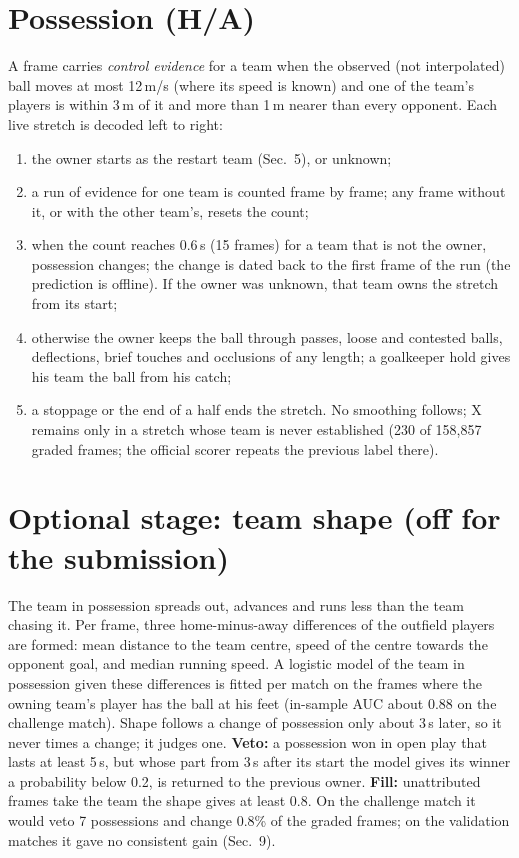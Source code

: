 \documentclass[10pt,a4paper]{article}
\begin{document}
\section{Possession (H/A)}
A frame carries \emph{control evidence} for a team when the observed (not interpolated) ball moves at most 12\,m/s (where its speed
is known) and one of the team's players is within 3\,m of it and more than 1\,m nearer than every opponent. Each live stretch is
decoded left to right:
\begin{enumerate}
\item the owner starts as the restart team (Sec.~5), or unknown;
\item a run of evidence for one team is counted frame by frame; any frame without it, or with the other team's, resets the count;
\item when the count reaches 0.6\,s (15 frames) for a team that is not the owner, possession changes; the change is dated back to
      the first frame of the run (the prediction is offline). If the owner was unknown, that team owns the stretch from its start;
\item otherwise the owner keeps the ball through passes, loose and contested balls, deflections, brief touches and occlusions of
      any length; a goalkeeper hold gives his team the ball from his catch;
\item a stoppage or the end of a half ends the stretch. No smoothing follows; X remains only in a stretch whose team is never
      established (230 of 158{,}857 graded frames; the official scorer repeats the previous label there).
\end{enumerate}

\section{Optional stage: team shape (off for the submission)}
The team in possession spreads out, advances and runs less than the team chasing it. Per frame, three home-minus-away
differences of the outfield players are formed: mean distance to the team centre, speed of the centre towards the opponent goal,
and median running speed. A logistic model of the team in possession given these differences is fitted per match on the frames
where the owning team's player has the ball at his feet (in-sample AUC about 0.88 on the challenge match). Shape follows a change
of possession only about 3\,s later, so it never times a change; it judges one. \textbf{Veto:} a possession won in open play that
lasts at least 5\,s, but whose part from 3\,s after its start the model gives its winner a probability below 0.2, is returned to
the previous owner. \textbf{Fill:} unattributed frames take the team the shape gives at least 0.8. On the challenge match it would
veto 7 possessions and change 0.8\% of the graded frames; on the validation matches it gave no consistent gain (Sec.~9).
\end{document}
